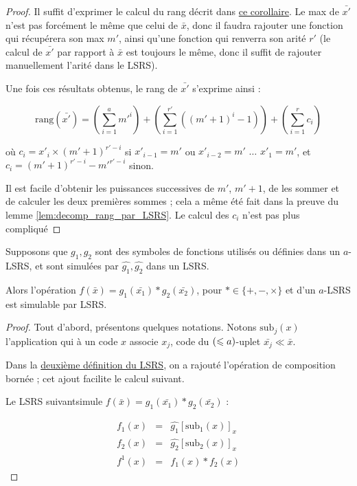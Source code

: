 	\begin{proof}
		Il suffit d'exprimer le calcul du rang décrit dans \hyperref[coro:rang_bon_ordre]{ce corollaire}. Le max de $\bar{x'}$ n'est pas forcément le même que celui de $\bar{x}$, donc il faudra rajouter une fonction qui récupérera son max $m'$, ainsi qu'une fonction qui renverra son arité $r'$ (le calcul de $\bar{x'}$ par rapport à $\bar{x}$ est toujours le même, donc il suffit de rajouter manuellement l'arité dans le LSRS). 
		
		Une fois ces résultats obtenus, le rang de $\bar{x'}$ s'exprime ainsi :
		
		\begin{equation}
			\text{rang}\left(\bar{x'}\right) = \left( \sum_{i=1}^{a} m'^i \right) + \left( \sum_{i=1}^{r'} \left( \left(m'+1\right)^i -1 \right) \right) + \left(\sum_{i=1}^{r} c_i \right)
		\end{equation}
		
		où $c_i = x'_i \times \left(m'+1\right)^{r'-i}$ si $x'_{i-1} = m'$ ou $x'_{i-2} = m'$ $\dots$ $x'_{1} = m'$, et $c_i = \left(m'+1\right)^{r'-i}-m'^{r'-i}$ sinon.
		
		Il est facile d'obtenir les puissances successives de $m'$, $m'+1$, de les sommer et de calculer les deux premières sommes ; cela a même été fait dans la preuve du lemme \ref{lem:decomp_rang_par_LSRS}. Le calcul des $c_i$ n'est pas plus compliqué 
	\end{proof}
	
	
	\begin{lemma}
		\label{lem:operation_simulable}
		Supposons que $g_1, g_2$ sont des symboles de fonctions utilisés ou définies dans un $a$-LSRS, et sont simulées par $\hat{g_1},\hat{g_2}$ dans un LSRS.
		
		Alors l'opération $f\left(\bar{x}\right) = g_1\left(\bar{x_1}\right) * g_2\left(\bar{x_2}\right)$, pour $* \in \{+, -, \times \}$ et d'un $a$-LSRS est simulable par LSRS.
	\end{lemma}
	
	\begin{proof}
		Tout d'abord, présentons quelques notations. Notons $\text{sub}_j(x)$ l'application qui à un code $x$ associe $x_j$, code du $\left( \leqslant a \right)$-uplet $\bar{x_j} \ll \bar{x}$. 
		
		Dans la \hyperref[def:LSRS_2]{deuxième définition du LSRS}, on a rajouté l'opération de composition bornée ; cet ajout facilite le calcul suivant. 
		
		Le LSRS suivant\footnotemark  simule $f\left(\bar{x}\right) = g_1\left(\bar{x_1}\right) * g_2\left(\bar{x_2}\right)$ :
			
		
		\begin{eqnarray}
			f_1(x) & = & \hat{g_1}\left[ \text{sub}_1(x) \right]_x \\
			f_2(x) & = & \hat{g_2}\left[ \text{sub}_2(x) \right]_x \\
			f^1(x) & = & f_1(x) * f_2(x) 
		\end{eqnarray}
	\end{proof}
	
